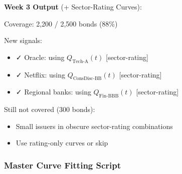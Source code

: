 \documentclass[11pt,a4paper]{article}
\begin{document}
\begin{examplebox}
\vspace{0.3cm}

\textbf{Week 3 Output} (+ Sector-Rating Curves):

Coverage: 2,200 / 2,500 bonds (88\%)

New signals:
\begin{itemize}
    \item ✓ Oracle: using $Q_{\text{Tech-A}}(t)$ [sector-rating]
    \item ✓ Netflix: using $Q_{\text{ConsDisc-BB}}(t)$ [sector-rating]
    \item ✓ Regional banks: using $Q_{\text{Fin-BBB}}(t)$ [sector-rating]
\end{itemize}

Still not covered (300 bonds):
\begin{itemize}
    \item Small issuers in obscure sector-rating combinations
    \item Use rating-only curves or skip
\end{itemize}
\end{examplebox}

\subsubsection{Master Curve Fitting Script}
\end{document}
